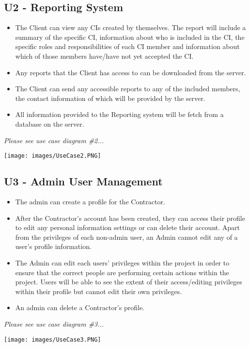 \documentclass[11pt]{article}
\begin{document}
\subsection{U2 - Reporting System}
\begin{flushleft}
        \begin{itemize}
            \item The Client can view any CIs created by themselves. The report will include a summary of the specific CI, information about who is included in the CI, the specific roles and responsibilities of each CI member and information about which of those members have/have not yet accepted the CI. \\[0.5cm]
            \item Any reports that the Client has access to can be downloaded from the server.\\[0.5cm]
            \item The Client can send any accessible reports to any of the included members, the contact information of which will be provided by the server.\\[0.5cm]
            \item All information provided to the Reporting system will be fetch from a database on the server.\\[0.5cm]
        \end{itemize}
    \textit{Please see use case diagram \#2...}\\[0.5cm]
\end{flushleft}
\texttt{[image: images/UseCase2.PNG]}
\subsection{U3 - Admin User Management}
\begin{flushleft}
        \begin{itemize}
            \item The admin can create a profile for the Contractor.\\[0.5cm]
            \item After the Contractor's account has been created, they can access their profile to edit any personal information settings or can delete their account. Apart from the privileges of each non-admin user, an Admin cannot edit any of a user's profile information.\\[0.5cm]
            \item The Admin can edit each users' privileges within the project in order to ensure that the correct people are performing certain actions within the project. Users will be able to see the extent of their access/editing privileges within their profile but cannot edit their own privileges.\\[0.5cm]
            \item An admin can delete a Contractor's profile.\\[0.5cm]
        \end{itemize}
    \textit{Please see use case diagram \#3...}\\[0.5cm]
\end{flushleft}
\texttt{[image: images/UseCase3.PNG]}
\end{document}
